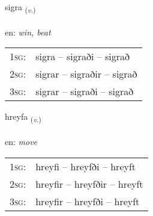 \documentclass[frontgrid, backgrid]{flacards}\usepackage[]{graphicx}\usepackage[]{color}
\begin{document}
\renewcommand{\blhead}{\vskip5pt {\small\bfseries\footnotesize Sagnorð | Verb }}
\renewcommand{\bcfoot}{\vskip5pt \hspace{2pt}{\small\bfseries\footnotesize 2K}}


{sigra \small{\textsubscript{(\textit{v.})}} \\[1ex] %
\textphonetic{[sɪɣra]} \\
en: \emph{win, beat} \\  [2ex]
\renewcommand*{\arraystretch}{0.8}
\begin{tabular}{p{1cm}l}
\textsc{1sg}: & sigra -- sigraði -- sigrað \\ 
\textsc{2sg}: & sigrar -- sigraðir -- sigrað \\ 
\textsc{3sg}: & sigrar -- sigraði -- sigrað \\ 
\end{tabular}
}

\renewcommand{\flhead}{\vskip5pt \fboxsep=0pt {\small\bfseries\footnotesize Sagnorð | Verb}}
\renewcommand{\fcfoot}{\vskip5pt \fboxsep=0pt \hspace{2pt}{\small\bfseries\footnotesize 2K}}

\renewcommand{\blhead}{\vskip5pt {\small\bfseries\footnotesize Sagnorð | Verb }}
\renewcommand{\bcfoot}{\vskip5pt \hspace{2pt}{\small\bfseries\footnotesize 2K}}


{hreyfa \small{\textsubscript{(\textit{v.})}} \\[1ex] %
\textphonetic{[r̥eiːva]} \\
en: \emph{move} \\  [2ex]
\renewcommand*{\arraystretch}{0.8}
\begin{tabular}{p{1cm}l}
\textsc{1sg}: & hreyfi -- hreyfði -- hreyft \\ 
\textsc{2sg}: & hreyfir -- hreyfðir -- hreyft \\ 
\textsc{3sg}: & hreyfir -- hreyfði -- hreyft \\ 
\end{tabular}
}
\end{document}
